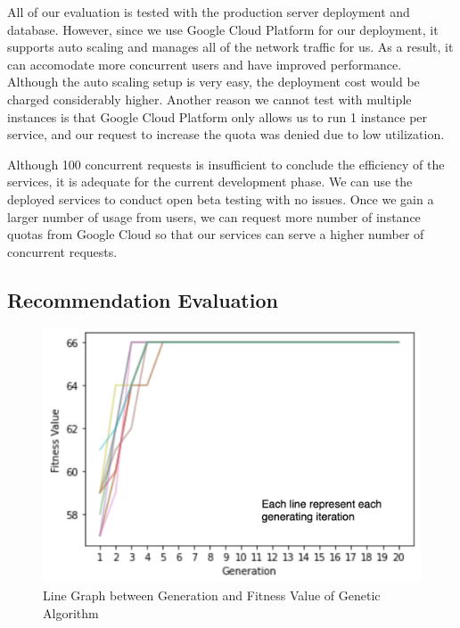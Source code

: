 \documentclass[12pt,oneside,openright,a4paper]{cpe-english-project}
\begin{document}
All of our evaluation is tested with the production server deployment and database. However, since we use Google Cloud Platform for our deployment, it supports auto scaling and manages all of the network traffic for us. As a result, it can accomodate more concurrent users and have improved performance. Although the auto scaling setup is very easy, the deployment cost would be charged considerably higher. Another reason we cannot test with multiple instances is that Google Cloud Platform only allows us to run 1 instance per service, and our request to increase the quota was denied due to low utilization.

Although 100 concurrent requests is insufficient to conclude the efficiency of the services, it is adequate for the current development phase. We can use the deployed services to conduct open beta testing with no issues. Once we gain a larger number of usage from users, we can request more number of instance quotas from Google Cloud so that our services can serve a higher number of concurrent requests.

\subsection{Recommendation Evaluation}


\begin{figure}[H]\centering
\includegraphics[width=350pt]{./images/4LineGraphbetweenGenerationandFitnessValueofGeneticAlgorithm.png}
\caption{Line Graph between Generation and Fitness Value of Genetic Algorithm}\label{fig:4LineGraphbetweenGenerationandFitnessValueofGeneticAlgorithm}
\end{figure}\vspace{-24pt}
\end{document}
